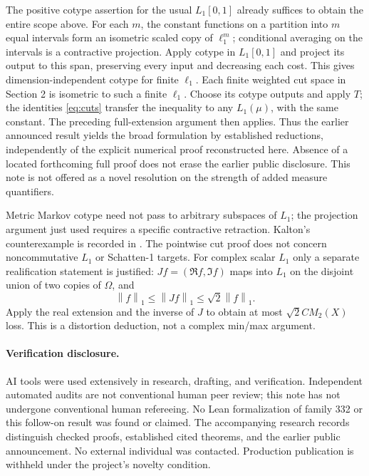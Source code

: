 \documentclass[11pt]{article}
\newcommand{\norm}[1]{\left\lVert#1\right\rVert}
\newcommand{\1}{\mathbf1}
\begin{document}
The positive cotype assertion for the usual $L_1[0,1]$ already suffices to obtain the entire scope above. For each $m$, the constant functions on a partition into $m$ equal intervals form an isometric scaled copy of $\ell_1^m$; conditional averaging on the intervals is a contractive projection. Apply cotype in $L_1[0,1]$ and project its output to this span, preserving every input and decreasing each cost. This gives dimension-independent cotype for finite $\ell_1$. Each finite weighted cut space in Section 2 is isometric to such a finite $\ell_1$. Choose its cotype outputs and apply $T$; the identities \eqref{eq:cuts} transfer the inequality to any $L_1(\mu)$, with the same constant. The preceding full-extension argument then applies. Thus the earlier announced result yields the broad formulation by established reductions, independently of the explicit numerical proof reconstructed here. Absence of a located forthcoming full proof does not erase the earlier public disclosure. This note is not offered as a novel resolution on the strength of added measure quantifiers.

Metric Markov cotype need not pass to arbitrary subspaces of $L_1$; the projection argument just used requires a specific contractive retraction. Kalton's counterexample is recorded in \cite[Theorem 1.14]{MN13}. The pointwise cut proof does not concern noncommutative $L_1$ or Schatten-1 targets. For complex scalar $L_1$ only a separate realification statement is justified: $Jf=(\Re f,\Im f)$ maps into $L_1$ on the disjoint union of two copies of $\Omega$, and
\[\norm f_1\leq\norm{Jf}_1\leq\sqrt2\norm f_1.\]
Apply the real extension and the inverse of $J$ to obtain at most $\sqrt2 C M_2(X)$ loss. This is a distortion deduction, not a complex min/max argument.

\paragraph{Verification disclosure.}
AI tools were used extensively in research, drafting, and verification. Independent automated audits are not conventional human peer review; this note has not undergone conventional human refereeing. No Lean formalization of family 332 or this follow-on result was found or claimed. The accompanying research records distinguish checked proofs, established cited theorems, and the earlier public announcement. No external individual was contacted. Production publication is withheld under the project's novelty condition.
\end{document}
